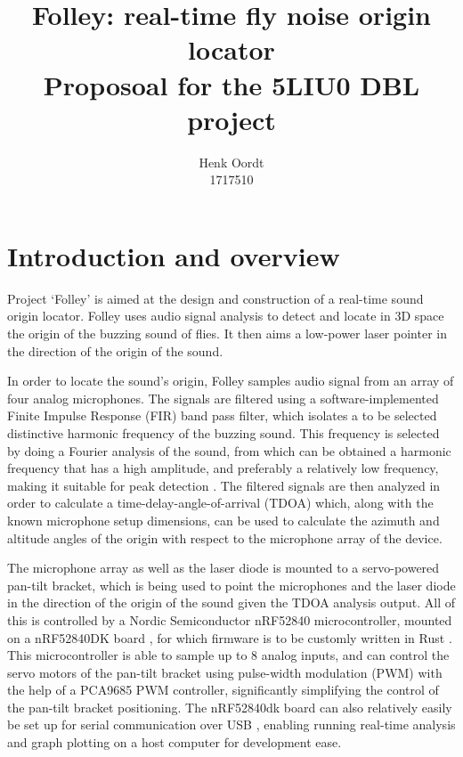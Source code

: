 \documentclass[a4paper]{article}
\begin{document}
\title{{Folley: real-time fly noise origin locator} \\\large {Proposoal for the 5LIU0 DBL project}}
\author{{Henk Oordt} \hfill
\\
{1717510} \hfill}

\maketitle

\section{Introduction and overview}
Project `Folley' is aimed at the design and construction of a real-time sound origin locator. Folley uses audio signal analysis to detect and locate in 3D space the origin of the buzzing sound of flies. It then aims a low-power laser pointer in the direction of the origin of the sound.

In order to locate the sound's origin, Folley samples audio signal from an array of four analog microphones. The signals are filtered using a software-implemented Finite Impulse Response (FIR) band pass filter, which isolates a to be selected distinctive harmonic frequency of the buzzing sound. This frequency is selected by doing a Fourier analysis \cite{fourier_analysis} of the sound, from which can be obtained a harmonic frequency that has a high amplitude, and preferably a relatively low frequency, making it suitable for peak detection \cite{peak_detection}. The filtered signals are then analyzed in order to calculate a time-delay-angle-of-arrival (TDOA) \cite{6327613} which, along with the known microphone setup dimensions, can be used to calculate the azimuth and altitude angles of the origin with respect to the microphone array of the device.

The microphone array as well as the laser diode is mounted to a servo-powered pan-tilt bracket, which is being used to point the microphones and the laser diode in the direction of the origin of the sound given the TDOA analysis output. All of this is controlled by a Nordic Semiconductor nRF52840 microcontroller, mounted on a nRF52840DK board \cite{nrf52840-dk}, for which firmware is to be customly written in Rust \cite{rust}. This microcontroller is able to sample up to 8 analog inputs, and can control the servo motors of the pan-tilt bracket using pulse-width modulation (PWM) \cite{GULYAEV20161529} with the help of a PCA9685 \cite{pca9685} PWM controller, significantly simplifying the control of the pan-tilt bracket positioning. The nRF52840dk board can also relatively easily be set up for serial communication over USB \cite{usb}, enabling running real-time analysis and graph plotting on a host computer for development ease.
\end{document}
